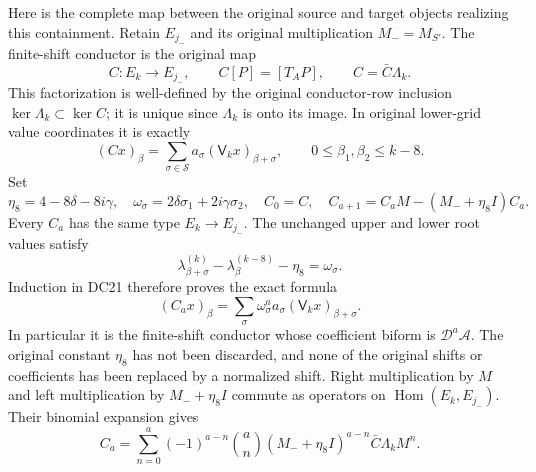 \documentclass[11pt]{article}
\begin{document}
Here is the complete map between the original source and target
objects realizing this containment.  Retain $E_{j_-}$ and its
original multiplication $M_-=M_{S'}$.  The finite-shift conductor
is the original map
\[
 C:E_k\to E_{j_-},\qquad C[P]=[T_AP],\qquad
 C=\bar C\Lambda_k.                                             \tag{DC19}
\]
This factorization is well-defined by the original conductor-row
inclusion $\ker\Lambda_k\subset\ker C$; it is unique since
$\Lambda_k$ is onto its image.  In original lower-grid value
coordinates it is exactly
\[
 (Cx)_\beta=\sum_{\sigma\in\mathcal S}
                        a_\sigma(\mathsf V_kx)_{\beta+\sigma},
 \qquad 0\le\beta_1,\beta_2\le k-8.                             \tag{DC20}
\]
Set
\[
 \eta_8=4-8\delta-8i\gamma,
 \quad\omega_\sigma=2\delta\sigma_1+2i\gamma\sigma_2,
 \quad C_0=C,\quad
 C_{a+1}=C_aM-(M_-+\eta_8I)C_a.                                 \tag{DC21}
\]
Every $C_a$ has the same type $E_k\to E_{j_-}$.  The unchanged
upper and lower root values satisfy
\[
 \lambda^{(k)}_{\beta+\sigma}
   -\lambda^{(k-8)}_\beta-\eta_8=\omega_\sigma.
\]
Induction in DC21 therefore proves the exact formula
\[
 (C_ax)_\beta=\sum_\sigma
                  \omega_\sigma^a a_\sigma(\mathsf V_kx)_{\beta+\sigma}.
                                                                    \tag{DC22}
\]
In particular it is the finite-shift conductor whose coefficient
biform is $\mathcal D^a\mathcal A$.  The original constant $\eta_8$
has not been discarded, and none of the original shifts or coefficients
has been replaced by a normalized shift.
Right multiplication by $M$ and left multiplication by
$M_-+\eta_8I$ commute as operators on $\operatorname{Hom}(E_k,E_{j_-})$.
Their binomial expansion gives
\[
 C_a=\sum_{n=0}^a(-1)^{a-n}\binom an
       (M_-+\eta_8I)^{a-n}\bar C\Lambda_k M^n.                   \tag{DC23}
\]
\end{document}

